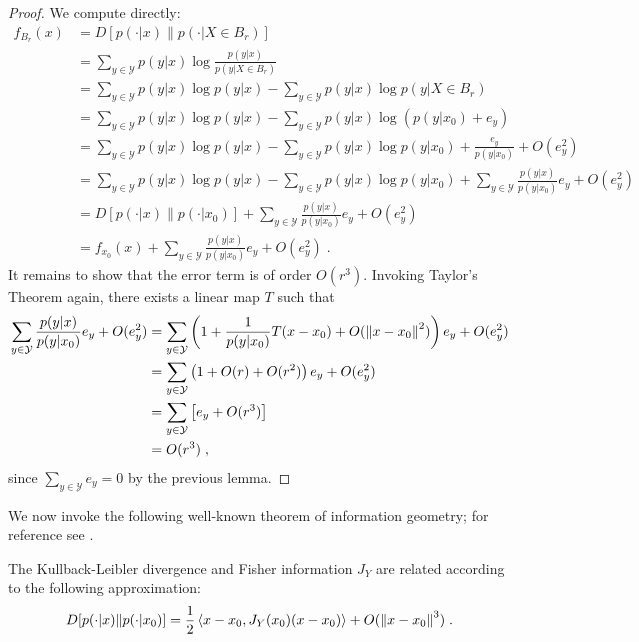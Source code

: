 \documentclass[english]{scrartcl}
\begin{document}
	\begin{proof}
		We compute directly: 
		\begin{align*}
			f_{B_r}(x) &= D[p(\cdot|x)\|p(\cdot|X \in B_r)] \\
			&= \sum_{y\in \mathcal{Y}} p(y|x) \log \frac{p(y|x)}{p(y|X \in B_r)} \\
			&= \sum_{y\in \mathcal{Y}} p(y|x) \log p(y|x) - \sum_{y \in \mathcal{Y}} p(y|x) \log p(y|X \in B_r)\; \\
			&= \sum_{y\in \mathcal{Y}} p(y|x) \log p(y|x) - \sum_{y \in \mathcal{Y}} p(y|x) \log (p(y|x_0) + e_y) \\ 
			&= \sum_{y\in \mathcal{Y}} p(y|x) \log p(y|x) - \sum_{y \in \mathcal{Y}} p(y|x) \log p(y|x_0) + \frac{e_y}{p(y|x_0)} + O(e_y^2)   \\
			&= \sum_{y\in \mathcal{Y}} p(y|x) \log p(y|x) - \sum_{y \in \mathcal{Y}} p(y|x) \log p(y|x_0) + \sum_{y\in \mathcal{Y}} \frac{p(y|x)}{p(y|x_0)}e_y + O(e_y^2) \\
			&= D[p(\cdot|x)\|p(\cdot|x_0)] + \sum_{y\in \mathcal{Y}} \frac{p(y|x)}{p(y|x_0)}e_y + O(e_y^2) \\
			&= f_{x_0}(x) + \sum_{y\in \mathcal{Y}} \frac{p(y|x)}{p(y|x_0)}e_y + O(e_y^2)\;.
		\end{align*}
		It remains to show that the error term is of order $O(r^3)$. Invoking Taylor's Theorem again, there exists a linear map $T$ such that 
		\begin{align*}
			\sum_{y\in \mathcal{Y}} \frac{p(y|x)}{p(y|x_0)}e_y + O(e_y^2) &= \sum_{y\in \mathcal{Y}} \left(1 +  \frac{1}{p(y|x_0)} T(x - x_0) + O(\left\lVert x - x_0\right\rVert^2) \right)e_y + O(e_y^2) \\
			&= \sum_{y\in \mathcal{Y}} \left(1 +  O(r) + O(r^2) \right)e_y + O(e_y^2) \\
			&= \sum_{y\in\mathcal{Y}}\left[e_y + O(r^3)\right] \\
			&= O(r^3)\;, 
		\end{align*}
		since $\sum_{y\in \mathcal{Y}} e_y = 0$ by the previous lemma. 
	\end{proof}

	We now invoke the following well-known theorem of information geometry; for reference see \cite{Amari2000}. 

	\begin{thm}
		The Kullback-Leibler divergence and Fisher information $J_Y$ are related according to the following approximation: 
		\begin{equation*}
			D[p(\cdot|x)\|p(\cdot|x_0)] = \frac{1}{2} \left<x - x_0, J_Y(x_0)(x - x_0)\right> + O(\left\lVert x - x_0\right\rVert^3)\;. 
		\end{equation*}
	\end{thm}
\end{document}
